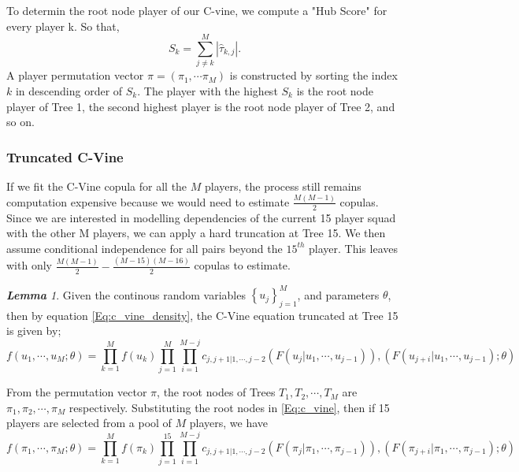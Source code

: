 \documentclass[12pt,oneside,a4paper]{book}
\theoremstyle{definition}
\theoremstyle{remark}
\newtheorem{lem}{\bf Lemma}[section]
\begin{document}
				To determin the root node player of our C-vine, we compute a "Hub Score" for every player k. So that,
				\begin{equation}\label{Eq:hub_score}
					S_{k} = \sum_{j \neq k}^{M} \left|\hat{\tau}_{k,j} \right|.
				\end{equation}
				A player permutation vector $\pi = \left(\pi_1, \cdots \pi_{M}\right)$  is constructed by sorting the index $k$ in descending order of $S_k$. The player with the highest $S_k$ is the root node player of Tree 1, the second highest player is the root node player of Tree 2, and so on.

				\subsubsection{Truncated C-Vine}
				If we fit the C-Vine copula for all the $M$ players, the process still remains computation expensive because we would need to estimate $\frac{M\left(M-1\right)}{2}$ copulas.
				Since we are interested in modelling dependencies of the current 15 player squad with the other M players, we can apply a hard truncation at Tree 15. We then assume conditional independence for all pairs beyond the $15^{th}$ player. This leaves with only $\frac{M\left(M-1\right)}{2} - \frac{\left(M-15\right) \left(M-16\right)}{2}$ copulas to estimate.

				\begin{lem}
					Given the continous random variables $\left\{u_{j}\right\}_{j=1}^{M}$, and parameters $\theta$, then by equation \ref{Eq:c_vine_density}, the C-Vine equation truncated at Tree 15 is given by;
					\begin{equation}\label{Eq:c_vine}
						f\left(u_1, \cdots, u_M ; \theta \right) = \prod_{k=1}^{M}f\left(u_{k}\right) \prod_{j=1}^{M} \prod_{i=1}^{M-j}
						c_{j, j+1 | 1, \cdots, j-2}
						\left( F\left(u_{j} | u_1, \cdots, u_{j-1}\right)\right), \left( F\left(u_{j+i} | u_1, \cdots, u_{j-1}\right); \theta\right)
					\end{equation}
				\end{lem}

				From the permutation vector $\pi$, the root nodes of Trees $T_1, T_2, \cdots, T_M$ are $\pi_1, \pi_2, \cdots, \pi_{M}$ respectively. Substituting the root nodes in \ref{Eq:c_vine}, then if 15 players are selected from a pool of $M$ players, we have
				\begin{equation}\label{Eq:c_vine_pi}
					f\left(\pi_1, \cdots, \pi_M ; \theta \right) = \prod_{k=1}^{M}f\left(\pi_{k}\right) \prod_{j=1}^{15} \prod_{i=1}^{M-j}
					c_{j, j+1 | 1, \cdots, j-2}
					\left( F\left(\pi_{j} | \pi_1, \cdots, \pi_{j-1}\right)\right), \left( F\left(\pi_{j+i} | \pi_1, \cdots, \pi_{j-1}\right); \theta\right)
				\end{equation}
\end{document}

